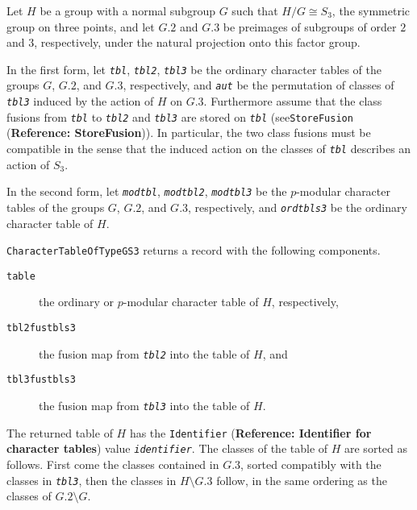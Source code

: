 \documentclass[a4paper,11pt]{report}
\begin{document}
{{{ Let $H$ be a group with a normal subgroup $G$ such that $H/G \cong S_3$, the symmetric group on three points, and let $G.2$ and $G.3$ be preimages of subgroups of order $2$ and $3$, respectively, under the natural projection onto this factor group. 

 In the first form, let \mbox{\texttt{\mdseries\slshape tbl}}, \mbox{\texttt{\mdseries\slshape tbl2}}, \mbox{\texttt{\mdseries\slshape tbl3}} be the ordinary character tables of the groups $G$, $G.2$, and $G.3$, respectively, and \mbox{\texttt{\mdseries\slshape aut}} be the permutation of classes of \mbox{\texttt{\mdseries\slshape tbl3}} induced by the action of $H$ on $G.3$. Furthermore assume that the class fusions from \mbox{\texttt{\mdseries\slshape tbl}} to \mbox{\texttt{\mdseries\slshape tbl2}} and \mbox{\texttt{\mdseries\slshape tbl3}} are stored on \mbox{\texttt{\mdseries\slshape tbl}} (see{\nobreakspace}\texttt{StoreFusion} (\textbf{Reference: StoreFusion})). In particular, the two class fusions must be compatible in the sense that
the induced action on the classes of \mbox{\texttt{\mdseries\slshape tbl}} describes an action of $S_3$. 

 In the second form, let \mbox{\texttt{\mdseries\slshape modtbl}}, \mbox{\texttt{\mdseries\slshape modtbl2}}, \mbox{\texttt{\mdseries\slshape modtbl3}} be the $p$-modular character tables of the groups $G$, $G.2$, and $G.3$, respectively, and \mbox{\texttt{\mdseries\slshape ordtbls3}} be the ordinary character table of $H$. 

 \texttt{CharacterTableOfTypeGS3} returns a record with the following components. 
\begin{description}
\item[{\texttt{table}}]  the ordinary or $p$-modular character table of $H$, respectively, 
\item[{\texttt{tbl2fustbls3}}]  the fusion map from \mbox{\texttt{\mdseries\slshape tbl2}} into the table of $H$, and 
\item[{\texttt{tbl3fustbls3}}]  the fusion map from \mbox{\texttt{\mdseries\slshape tbl3}} into the table of $H$. 
\end{description}
 

 The returned table of $H$ has the \texttt{Identifier} (\textbf{Reference: Identifier for character tables}) value \mbox{\texttt{\mdseries\slshape identifier}}. The classes of the table of $H$ are sorted as follows. First come the classes contained in $G.3$, sorted compatibly with the classes in \mbox{\texttt{\mdseries\slshape tbl3}}, then the classes in $H \setminus G.3$ follow, in the same ordering as the classes of $G.2 \setminus G$. 

}}}
\end{document}
